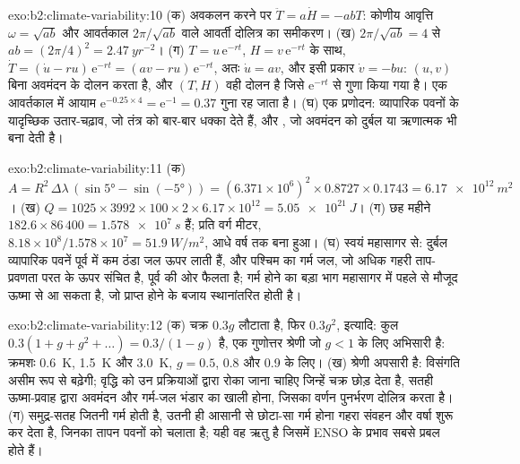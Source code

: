 \begin{solution}{exo:b2:climate-variability:10}
(क) अवकलन करने पर $\ddot T = a\dot H = -abT$: कोणीय आवृत्ति $\omega = \sqrt{ab}$ और
आवर्तकाल $2\pi/\sqrt{ab}$ वाले आवर्ती दोलित्र का समीकरण। (ख) $2\pi/\sqrt{ab} = 4$ से $ab =
(2\pi/4)^2 = \qty{2.47}{yr^{-2}}$। (ग) $T = u\,\mathrm{e}^{-rt}$, $H = v\,\mathrm{e}^{-rt}$ के साथ,
$\dot T = (\dot u - ru)\,\mathrm{e}^{-rt} = (av - ru)\,\mathrm{e}^{-rt}$, अतः $\dot u = av$, और
इसी प्रकार $\dot v = -bu$: $(u, v)$ बिना अवमंदन के दोलन करता है, और $(T, H)$ वही दोलन है
जिसे $\mathrm{e}^{-rt}$ से गुणा किया गया है। एक आवर्तकाल में आयाम $\mathrm{e}^{-0.25 \times
4} = \mathrm{e}^{-1} = 0.37$ गुना रह जाता है। (घ) एक प्रणोदन: व्यापारिक पवनों के यादृच्छिक उतार-चढ़ाव, जो
तंत्र को बार-बार धक्का देते हैं, और , जो अवमंदन को दुर्बल या
ऋणात्मक भी बना देती है।
\end{solution}

\begin{solution}{exo:b2:climate-variability:11}
(क) $A = R^2 \,\Delta\lambda\,(\sin\ang{5} - \sin(\ang{-5})) = (6.371 \times 10^6)^2 \times 0.8727
\times 0.1743 = \qty{6.17e12}{m^2}$। (ख) $Q = 1025 \times 3992 \times 100 \times 2 \times 6.17
\times 10^{12} = \qty{5.05e21}{J}$। (ग) छह महीने $182.6 \times 86\,400 = \qty{1.578e7}{s}$ हैं;
प्रति वर्ग मीटर, $8.18 \times 10^8/1.578 \times 10^7 = \qty{51.9}{W/m^2}$, आधे वर्ष तक
बना हुआ। (घ) स्वयं महासागर से: दुर्बल व्यापारिक पवनें पूर्व में कम ठंडा जल ऊपर लाती हैं, और पश्चिम का गर्म
जल, जो अधिक गहरी ताप-प्रवणता परत के ऊपर संचित है, पूर्व की ओर फैलता है; गर्म होने का बड़ा भाग
महासागर में पहले से मौजूद ऊष्मा से आ सकता है, जो प्राप्त होने के बजाय स्थानांतरित होती है।
\end{solution}

\begin{solution}{exo:b2:climate-variability:12}
(क) चक्र $0.3g$ लौटाता है, फिर $0.3g^2$, इत्यादि: कुल $0.3(1 + g + g^2 + \dots) =
0.3/(1 - g)$ है, एक गुणोत्तर श्रेणी जो $g < 1$ के लिए अभिसारी है: क्रमशः \qty{0.6}{K},
\qty{1.5}{K} और \qty{3.0}{K}, $g = 0.5$, 0.8 और 0.9 के लिए। (ख) श्रेणी अपसारी है: विसंगति असीम रूप से
बढ़ेगी; वृद्धि को उन प्रक्रियाओं द्वारा रोका जाना चाहिए जिन्हें चक्र छोड़ देता है, सतही ऊष्मा-प्रवाह द्वारा
अवमंदन और गर्म-जल भंडार का खाली होना, जिसका वर्णन पुनर्भरण दोलित्र करता है। (ग)
समुद्र-सतह जितनी गर्म होती है, उतनी ही आसानी से छोटा-सा गर्म होना गहरा संवहन और वर्षा शुरू कर देता है,
जिनका तापन पवनों को चलाता है; यही वह ऋतु है जिसमें ENSO के प्रभाव सबसे प्रबल होते हैं।
\end{solution}

